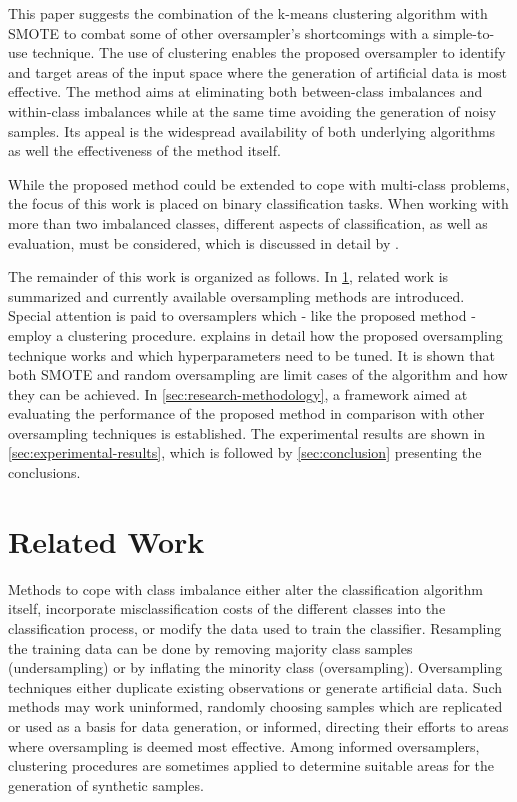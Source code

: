\documentclass[sort&compress]{elsarticle}
\begin{document}
This paper suggests the combination of the k-means clustering algorithm with \ac{SMOTE} to combat some of other oversampler's shortcomings with a simple-to-use technique. The use of clustering enables the proposed oversampler to identify and target areas of the input space where the generation of artificial data is most effective. The method aims at eliminating both between-class imbalances and within-class imbalances while at the same time avoiding the generation of noisy samples. Its appeal is the widespread availability of both underlying algorithms as well the effectiveness of the method itself.

While the proposed method could be extended to cope with multi-class problems, the focus of this work is placed on binary classification tasks. When working with more than two imbalanced classes, different aspects of classification, as well as evaluation, must be considered, which is discussed in detail by \citet{Fernandez.2013}.

The remainder of this work is organized as follows. In \cref{sec:related-work}, related work is summarized and currently available oversampling methods are introduced. Special attention is paid to oversamplers which - like the proposed method - employ a clustering procedure.  explains in detail how the proposed oversampling technique works and which hyperparameters need to be tuned. It is shown that both \ac{SMOTE} and random oversampling are limit cases of the algorithm and how they can be achieved. In \cref{sec:research-methodology}, a framework aimed at evaluating the performance of the proposed method in comparison with other oversampling techniques is established. The experimental results are shown in \cref{sec:experimental-results}, which is followed by \cref{sec:conclusion} presenting the conclusions.

\section{Related Work}
\label{sec:related-work}
Methods to cope with class imbalance either alter the classification algorithm itself, incorporate misclassification costs of the different classes into the classification process, or modify the data used to train the classifier. Resampling the training data can be done by removing majority class samples (undersampling) or by inflating the minority class (oversampling). Oversampling techniques either duplicate existing observations or generate artificial data. Such methods may work uninformed, randomly choosing samples which are replicated or used as a basis for data generation, or informed, directing their efforts to areas where oversampling is deemed most effective. Among informed oversamplers, clustering procedures are sometimes applied to determine suitable areas for the generation of synthetic samples.
\end{document}
